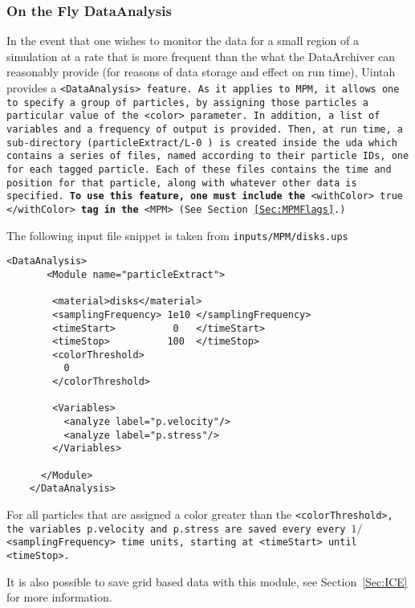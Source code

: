 \subsubsection{On the Fly DataAnalysis} \label{Sec:OTFA_MPM}

In the event that one wishes to monitor the data for a small region of a
simulation at a rate that is more frequent than the what the DataArchiver
can reasonably provide (for reasons of data storage and effect on run time),
Uintah provides a \tt <DataAnalysis> \normalfont feature.  As it applies
to MPM, it allows one to specify a group of particles, by assigning those
particles a particular value of the \tt <color> \normalfont parameter.
In addition, a list of variables and a frequency of output is provided.
Then, at run time, a sub-directory (\tt particleExtract/L-0 \normalfont)
is created inside the uda which contains
a series of files, named according to their particle IDs, one for each
tagged particle.  Each of these files contains the time and position for
that particle, along with whatever other data is specified.  {\bf To use this
feature, one must include the} \tt <withColor>   true   </withColor> \normalfont
{\bf tag in the} \tt <MPM> 
(See Section~\ref{Sec:MPMFlags}.)

The following input file snippet is taken from
\tt inputs/MPM/disks.ups \normalfont  
\begin{Verbatim}[fontsize=\footnotesize]
    <DataAnalysis>
       <Module name="particleExtract">

        <material>disks</material>
        <samplingFrequency> 1e10 </samplingFrequency>
        <timeStart>          0   </timeStart>
        <timeStop>          100  </timeStop>
        <colorThreshold>
          0
        </colorThreshold>

        <Variables>
          <analyze label="p.velocity"/>
          <analyze label="p.stress"/>
        </Variables>

      </Module>
    </DataAnalysis>
\end{Verbatim}

For all particles that are assigned a color greater than the
\tt <colorThreshold>, \normalfont the variables
\tt p.velocity \normalfont and
\tt p.stress \normalfont are saved every every
$1/$\tt <samplingFrequency> \normalfont time units, starting at
\tt <timeStart> \normalfont until
\tt <timeStop>. \normalfont

It is also possible to save grid based data with this module,
see Section~\ref{Sec:ICE} for more information.

